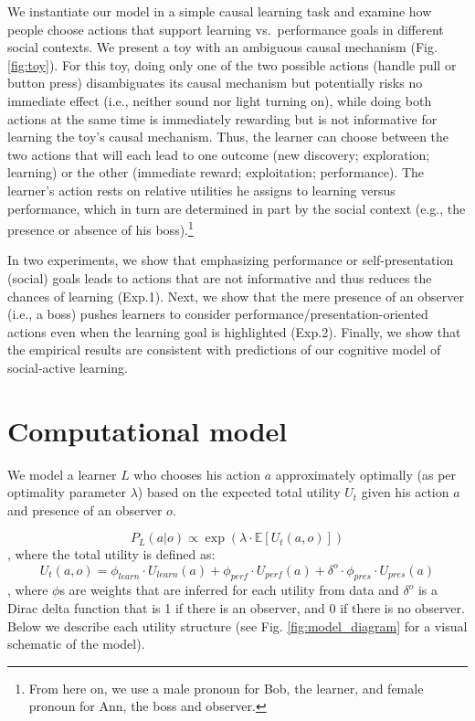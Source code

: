 \documentclass[10pt, letterpaper]{article}
\begin{document}
We instantiate our model in a simple causal learning task and examine
how people choose actions that support learning vs.~performance goals in
different social contexts. We present a toy with an ambiguous causal
mechanism (Fig. \ref{fig:toy}). For this toy, doing only one of the two
possible actions (handle pull or button press) disambiguates its causal
mechanism but potentially risks no immediate effect (i.e., neither sound
nor light turning on), while doing both actions at the same time is
immediately rewarding but is not informative for learning the toy's
causal mechanism. Thus, the learner can choose between the two actions
that will each lead to one outcome (new discovery; exploration;
learning) or the other (immediate reward; exploitation; performance).
The learner's action rests on relative utilities he assigns to learning
versus performance, which in turn are determined in part by the social
context (e.g., the presence or absence of his
boss).\footnote{From here on, we use a male pronoun for Bob, the learner, and female pronoun for Ann, the boss and observer.}

In two experiments, we show that emphasizing performance or
self-presentation (social) goals leads to actions that are not
informative and thus reduces the chances of learning (Exp.1). Next, we
show that the mere presence of an observer (i.e., a boss) pushes
learners to consider performance/presentation-oriented actions even when
the learning goal is highlighted (Exp.2). Finally, we show that the
empirical results are consistent with predictions of our cognitive model
of social-active learning.

\section{Computational model}\label{computational-model}

We model a learner \(L\) who chooses his action \(a\) approximately
optimally (as per optimality parameter \(\lambda\)) based on the
expected total utility \(U_{t}\) given his action \(a\) and presence of
an observer \(o\).

\[ P_L(a | o) \propto \exp(\lambda \cdot \mathbb{E}[U_{t}(a,o)])\],
\noindent
where the total utility is defined as:
\[U_{t}(a,o) = \phi_{learn} \cdot U_{learn}(a) + \phi_{perf} \cdot U_{perf}(a) + \delta^o \cdot \phi_{pres} \cdot U_{pres}(a)\],
\noindent
where \(\phi\)s are weights that are inferred for each utility from data
and \(\delta^o\) is a Dirac delta function that is 1 if there is an
observer, and 0 if there is no observer. Below we describe each utility
structure (see Fig. \ref{fig:model_diagram} for a visual schematic of
the model).
\end{document}
